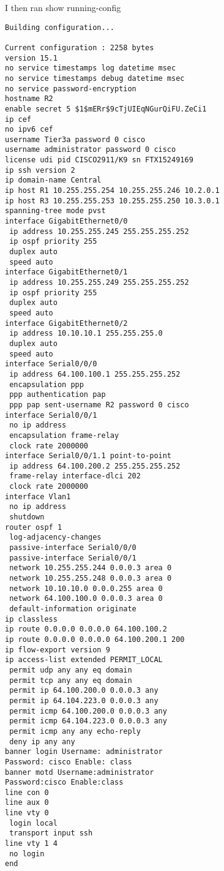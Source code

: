 \documentclass[../EngineeringJournal_CDavis.tex]{subfiles}
\begin{document}
I then ran show running-config
\begin{mdframed}
\scriptsize
\begin{verbatim}
Building configuration...

Current configuration : 2258 bytes
version 15.1
no service timestamps log datetime msec
no service timestamps debug datetime msec
no service password-encryption
hostname R2
enable secret 5 $1$mERr$9cTjUIEqNGurQiFU.ZeCi1
ip cef
no ipv6 cef
username Tier3a password 0 cisco
username administrator password 0 cisco
license udi pid CISCO2911/K9 sn FTX15249169
ip ssh version 2
ip domain-name Central
ip host R1 10.255.255.254 10.255.255.246 10.2.0.1 
ip host R3 10.255.255.253 10.255.255.250 10.3.0.1 
spanning-tree mode pvst
interface GigabitEthernet0/0
 ip address 10.255.255.245 255.255.255.252
 ip ospf priority 255
 duplex auto
 speed auto
interface GigabitEthernet0/1
 ip address 10.255.255.249 255.255.255.252
 ip ospf priority 255
 duplex auto
 speed auto
interface GigabitEthernet0/2
 ip address 10.10.10.1 255.255.255.0
 duplex auto
 speed auto
interface Serial0/0/0
 ip address 64.100.100.1 255.255.255.252
 encapsulation ppp
 ppp authentication pap
 ppp pap sent-username R2 password 0 cisco
interface Serial0/0/1
 no ip address
 encapsulation frame-relay
 clock rate 2000000
interface Serial0/0/1.1 point-to-point
 ip address 64.100.200.2 255.255.255.252
 frame-relay interface-dlci 202
 clock rate 2000000
interface Vlan1
 no ip address
 shutdown
router ospf 1
 log-adjacency-changes
 passive-interface Serial0/0/0
 passive-interface Serial0/0/1
 network 10.255.255.244 0.0.0.3 area 0
 network 10.255.255.248 0.0.0.3 area 0
 network 10.10.10.0 0.0.0.255 area 0
 network 64.100.100.0 0.0.0.3 area 0
 default-information originate
ip classless
ip route 0.0.0.0 0.0.0.0 64.100.100.2 
ip route 0.0.0.0 0.0.0.0 64.100.200.1 200
ip flow-export version 9
ip access-list extended PERMIT_LOCAL
 permit udp any any eq domain
 permit tcp any any eq domain
 permit ip 64.100.200.0 0.0.0.3 any
 permit ip 64.104.223.0 0.0.0.3 any
 permit icmp 64.100.200.0 0.0.0.3 any
 permit icmp 64.104.223.0 0.0.0.3 any
 permit icmp any any echo-reply
 deny ip any any
banner login Username: administrator
Password: cisco Enable: class
banner motd Username:administrator
Password:cisco Enable:class
line con 0
line aux 0
line vty 0
 login local
 transport input ssh
line vty 1 4
 no login
end

\end{verbatim}
\normalsize
\end{mdframed}
\end{document}
